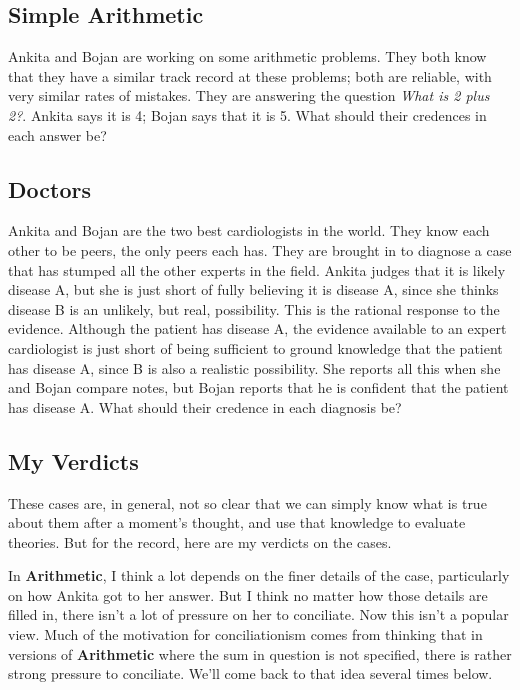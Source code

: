 \subsection{Simple Arithmetic}
\label{simplearithmetic}

\gls{Ankita} and \gls{Bojan} are working on some arithmetic problems. They both know that they have a similar track record at these problems; both are reliable, with very similar rates of mistakes. They are answering the question \emph{What is 2 plus 2?}. \gls{Ankita} says it is 4; \gls{Bojan} says that it is 5. What should their credences in each answer be?

\subsection{Doctors}
\label{doctors}

\gls{Ankita} and \gls{Bojan} are the two best cardiologists in the world. They know each other to be peers, the only peers each has. They are brought in to diagnose a case that has stumped all the other experts in the field. \gls{Ankita} judges that it is likely disease A, but she is just short of fully believing it is disease A, since she thinks disease B is an unlikely, but real, possibility. This is the rational response to the evidence. Although the patient has disease A, the evidence available to an expert cardiologist is just short of being sufficient to ground knowledge that the patient has disease A, since B is also a realistic possibility. She reports all this when she and \gls{Bojan} compare notes, but \gls{Bojan} reports that he is confident that the patient has disease A. What should their credence in each diagnosis be?

\subsection{My Verdicts}
\label{myverdicts}

These cases are, in general, not so clear that we can simply know what is true about them after a moment's thought, and use that knowledge to evaluate theories. But for the record, here are my verdicts on the cases.

In \textbf{Arithmetic}, I think a lot depends on the finer details of the case, particularly on how \gls{Ankita} got to her answer. But I think no matter how those details are filled in, there isn't a lot of pressure on her to conciliate. Now this isn't a popular view. Much of the motivation for conciliationism comes from thinking that in versions of \textbf{Arithmetic} where the sum in question is not specified, there is rather strong pressure to conciliate. We'll come back to that idea several times below.

